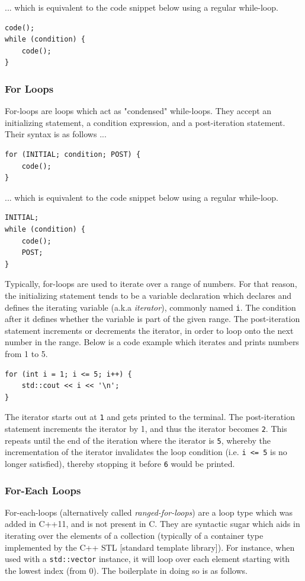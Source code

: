 \documentclass[12pt]{article}
\begin{document}
... which is equivalent to the code snippet below using a regular while-loop.

\begin{verbatim}
code();
while (condition) {
    code();
}
\end{verbatim}

\subsubsection{For Loops}
For-loops are loops which act as "condensed" while-loops. They accept an initializing statement, a condition expression, and a post-iteration statement. Their syntax is as follows ...

\begin{verbatim}
for (INITIAL; condition; POST) {
    code();
}
\end{verbatim}

... which is equivalent to the code snippet below using a regular while-loop.

\begin{verbatim}
INITIAL;
while (condition) {
    code();
    POST;
}
\end{verbatim}

Typically, for-loops are used to iterate over a range of numbers. For that reason, the initializing statement tends to be a variable declaration which declares and defines the iterating variable (a.k.a \textit{iterator}), commonly named \texttt{i}. The condition after it defines whether the variable is part of the given range. The post-iteration statement increments or decrements the iterator, in order to loop onto the next number in the range. Below is a code example which iterates and prints numbers from 1 to 5.

\begin{verbatim}
for (int i = 1; i <= 5; i++) {
    std::cout << i << '\n';
}
\end{verbatim}

The iterator starts out at \texttt{1} and gets printed to the terminal. The post-iteration statement increments the iterator by 1, and thus the iterator becomes \texttt{2}. This repeats until the end of the iteration where the iterator is \texttt{5}, whereby the incrementation of the iterator invalidates the loop condition (i.e. \texttt{i <= 5} is no longer satisfied), thereby stopping it before \texttt{6} would be printed.

\subsubsection{For-Each Loops}
For-each-loops (alternatively called \textit{ranged-for-loops}) are a loop type which was added in C++11, and is not present in C. They are syntactic sugar which aids in iterating over the elements of a collection (typically of a container type implemented by the C++ STL [standard template library]). For instance, when used with a \texttt{std::vector} instance, it will loop over each element starting with the lowest index (from 0). The boilerplate in doing so is as follows.
\end{document}
